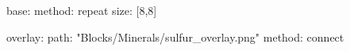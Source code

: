 base:
  method: repeat
  size: [8,8]

overlay:
  path: "Blocks/Minerals/sulfur_overlay.png"
  method: connect